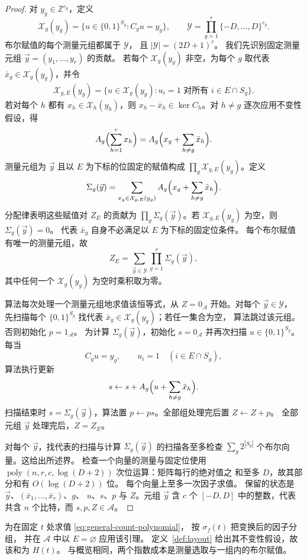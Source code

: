 \documentclass[11pt,reqno]{amsart}
\numberwithin{equation}{section}
\theoremstyle{definition}\newtheorem{definition}[theorem]{定义}
\theoremstyle{remark}\newtheorem{remark}[theorem]{注}
\newcommand{\poly}{\operatorname{poly}}
\begin{document}
\begin{proof}
对 $y_g\in\mathbb Z^{c_g}$，定义
\[
 \mathcal X_g(y_g)=\{u\in\{0,1\}^{S_g}:C_gu=y_g\},
 \qquad
 \mathcal Y=\prod_{g=1}^r\{-D,\ldots,D\}^{c_g}.
\]
布尔赋值的每个测量元组都属于 $\mathcal Y$，
且 $|\mathcal Y|=(2D+1)^c$。
我们先识别固定测量元组 $\vec y=(y_1,\ldots,y_r)$ 的贡献。
若每个 $\mathcal X_g(y_g)$ 非空，为每个 $g$ 取代表
$\bar x_g\in\mathcal X_g(y_g)$，并令
\[
 \mathcal X_{g,E}(y_g)=
 \{u\in\mathcal X_g(y_g):u_i=1\text{ 对所有 }i\in E\cap S_g\}.
\]
若对每个 $h$ 都有 $x_h\in\mathcal X_h(y_h)$，则
$x_h-\bar x_h\in\ker C_h$。对 $h\ne g$ 逐次应用不变性
假设，得
\[
 A_g\Bigl(\sum_{h=1}^r x_h\Bigr)
 =A_g\Bigl(x_g+\sum_{h\ne g}\bar x_h\Bigr).
\]
测量元组为 $\vec y$ 且以 $E$ 为下标的位固定的赋值构成
$\prod_g\mathcal X_{g,E}(y_g)$。定义
\begin{equation}\label{eq:group-sum}
 \Sigma_g(\vec y)=\sum_{x_g\in\mathcal X_{g,E}(y_g)}
       A_g\Bigl(x_g+\sum_{h\ne g}\bar x_h\Bigr).
\end{equation}
分配律表明这些赋值对 $Z_E$ 的贡献为
$\prod_g\Sigma_g(\vec y)$。若 $\mathcal X_{g,E}(y_g)$
为空，则 $\Sigma_g(\vec y)=0$。
代表 $\bar x_g$ 自身不必满足以 $E$ 为下标的固定位条件。
每个布尔赋值有唯一的测量元组，故
\[
 Z_E=\sum_{\vec y\in\mathcal Y}\prod_{g=1}^r\Sigma_g(\vec y),
\]
其中任何一个 $\mathcal X_g(y_g)$ 为空时乘积取为零。

算法每次处理一个测量元组地求值该恒等式，从
$Z=0_{\mathcal A}$ 开始。对每个 $\vec y\in\mathcal Y$，
先扫描每个 $\{0,1\}^{S_g}$ 找代表
$\bar x_g\in\mathcal X_g(y_g)$；若任一集合为空，
算法跳过该元组。否则初始化 $p=1_{\mathcal A}$。
为计算 $\Sigma_g(\vec y)$，初始化 $s=0_{\mathcal A}$
并再次扫描 $u\in\{0,1\}^{S_g}$。每当
\[
 C_gu=y_g,\qquad u_i=1\quad(i\in E\cap S_g),
\]
算法执行更新
\[
 s\leftarrow s+A_g\Bigl(u+\sum_{h\ne g}\bar x_h\Bigr).
\]
扫描结束时 $s=\Sigma_g(\vec y)$，算法置
$p\leftarrow ps$。全部组处理完后置 $Z\leftarrow Z+p$。
全部元组 $\vec y$ 处理完后，$Z=Z_E$。

对每个 $\vec y$，找代表的扫描与计算
$\Sigma_g(\vec y)$ 的扫描各至多检查
$\sum_g2^{|S_g|}$ 个布尔向量。这给出所述界。
检查一个向量的测量与固定位使用
$\poly(n,r,c,\log(D+2))$ 次位运算：矩阵每行的绝对值之
和至多 $D$，故其部分和有 $O(\log(D+2))$ 位。
每个向量上至多一次因子求值。
保留的状态是 $\vec y$、$(\bar x_1,\ldots,\bar x_r)$、$g$、
$u$、$s$、$p$ 与 $Z$。元组 $\vec y$ 含 $c$ 个 $[-D,D]$
中的整数，代表共含 $n$ 个比特，而 $s,p,Z\in\mathcal A$。
\end{proof}

为在固定 $t$ 处求值 \eqref{eq:general-count-polynomial}，
按 $\sigma_f(t)$ 把变换后的因子分组，
并在 $\mathcal A$ 中以 $E=\varnothing$ 应用该引理。
定义~\ref{def:layout} 给出其不变性假设，故该和为 $H(t)$。
与概览相同，两个指数成本是测量选取与一组内的布尔赋值。
\end{document}
